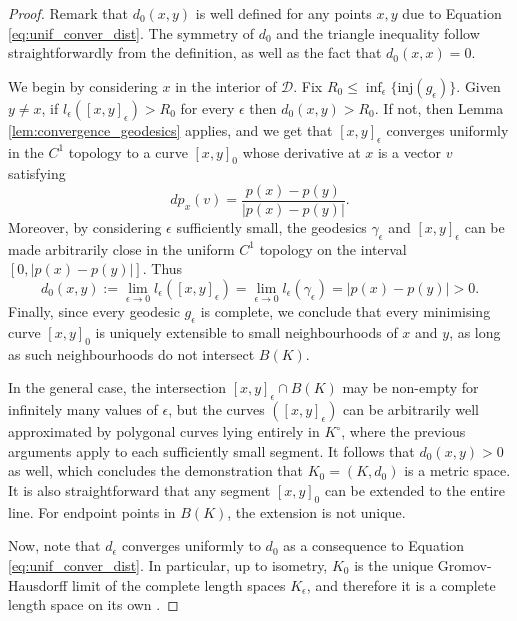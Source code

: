 \documentclass[reqno,11pt]{amsart}
\begin{document}
\begin{proof}
    Remark that \( d_0(x,y) \) is well defined for any points \(x, y \) due to Equation \eqref{eq:unif_conver_dist}. 
    The symmetry of \( d_0 \) and the triangle inequality follow straightforwardly from the definition, as well as the fact that \( d_0(x, x) = 0 \). 
    \par We begin by considering \( x \) in the interior of \( \mathcal{D} \).
    Fix \( R_0 \leq \inf_\epsilon\{\mathrm{inj}(g_\epsilon)\} \).
    Given \( y \neq x \), if \( l_\epsilon([x,y]_\epsilon) > R_0 \) for every \( \epsilon \) then \( d_0(x,y) > R_0 \).
    If not, then Lemma \ref{lem:convergence_geodesics} applies, and we get that \( [x,y]_\epsilon \) converges uniformly in the \( C^1 \) topology to a curve \( [x,y]_0 \) whose derivative at \( x \) is a vector \( v \) satisfying 
    \[
        dp_x(v) = \frac{p(x) - p(y)}{|p(x) - p(y)|}.
    \]
    Moreover, by considering \( \epsilon \) sufficiently small, the geodesics \( \gamma_\epsilon \) and \( [x, y]_\epsilon \) can be made arbitrarily close in the uniform \( C^1 \) topology on the interval \( [0, |p(x) - p(y)|]\). 
    Thus
    \[
        d_0(x,y) := \lim_{\epsilon\to 0}l_\epsilon([x,y]_\epsilon) = \lim_{\epsilon \to 0}l_\epsilon(\gamma_\epsilon) = |p(x) - p(y)| > 0.
    \]
    Finally, since every geodesic \(g_\epsilon\) is complete, we conclude that every minimising curve \( [x,y]_0 \) is uniquely extensible to small neighbourhoods of \(x\) and \(y\), as long as such neighbourhoods do not intersect \(B(K) \).
    \par In the general case, the intersection \( [x,y]_\epsilon \cap B(K) \) may be non-empty for infinitely many values of \( \epsilon \), but the curves \( ([x,y]_\epsilon) \) can be arbitrarily well approximated by polygonal curves lying entirely in \( K^\circ \), where the previous arguments apply to each sufficiently small segment.
    It follows that \( d_0(x, y) > 0 \) as well, which concludes the demonstration that \( K_0 = (K, d_0) \) is a metric space.
    It is also straightforward that any segment \( [x,y]_0 \) can be extended to the entire line.
    For endpoint points in \(B(K)\), the extension is not unique.
    \par Now, note that \( d_\epsilon \) converges uniformly to \( d_0 \) as a consequence to Equation \eqref{eq:unif_conver_dist}. 
    In particular, up to isometry, \( K_0 \) is the unique Gromov-Hausdorff limit of the complete length spaces \( K_\epsilon \), and therefore it is a complete length space on its own \cite[Theorem 7.5.1]{burago2022course}.

\end{proof}
\end{document}
